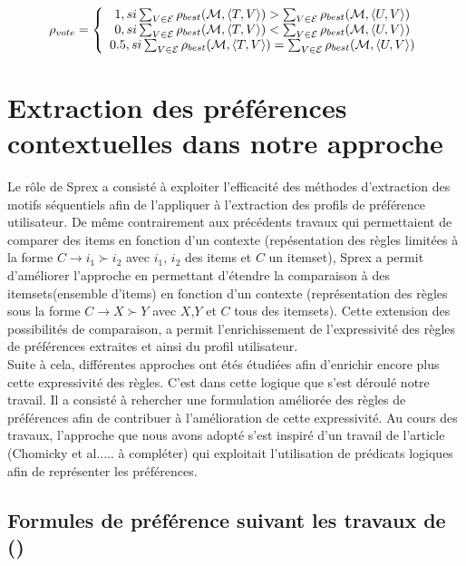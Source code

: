 \documentclass[a4paper,12pt,openany,oneside]{article}
\begin{document}
\[\rho_{vote}=
\left \{
\begin{array}{c c}
    1, si \sum_{V\in \mathcal{E}}\rho_{best}(\mathcal{M},\left<T,V\right>)>\sum_{V\in\mathcal{E}}\rho_{best}(\mathcal{M},\left<U,V\right>) \\
    0, si \sum_{V\in \mathcal{E}}\rho_{best}(\mathcal{M},\left<T,V\right>)<\sum_{V\in\mathcal{E}}\rho_{best}(\mathcal{M},\left<U,V\right>) \\
    0.5, si \sum_{V\in \mathcal{E}}\rho_{best}(\mathcal{M},\left<T,V\right>)=\sum_{V\in\mathcal{E}}\rho_{best}(\mathcal{M},\left<U,V\right>) \\
\end{array}
\right.
\]



\section{Extraction des préférences contextuelles dans notre approche}

Le rôle de  Sprex a consisté à exploiter l'efficacité des méthodes d'extraction des motifs séquentiels afin de l'appliquer à l'extraction des profils de préférence utilisateur. De même contrairement aux précédents travaux qui permettaient de comparer des items en fonction d'un contexte (repésentation des règles limitées à la forme $C\rightarrow i_1\succ i_2$ avec $i_1$, $i_2$ des items et $C$ un itemset), Sprex a permit d'améliorer l'approche en permettant d'étendre la comparaison à des itemsets(ensemble d'items) en fonction d'un contexte (représentation des règles sous la forme $C\rightarrow X\succ Y$ avec $X$,$Y$ et $C$ tous des itemsets). Cette extension des possibilités de comparaison, a permit l'enrichissement de l'expressivité des règles de préférences extraites et ainsi du profil utilisateur.\\
 
Suite à cela, différentes approches ont étés étudiées afin d'enrichir encore plus cette expressivité des règles. C'est dans cette logique que s'est déroulé notre travail. Il a consisté à rehercher une formulation améliorée des règles de préférences afin de contribuer à l'amélioration de cette expressivité. 
Au cours des travaux, l'approche que nous avons adopté s'est inspiré d'un travail de l'article (Chomicky et al..... à compléter) qui exploitait l'utilisation de prédicats logiques afin de représenter les préférences.



\subsection{Formules de préférence suivant les travaux de (\cite{CHO})}
\end{document}
